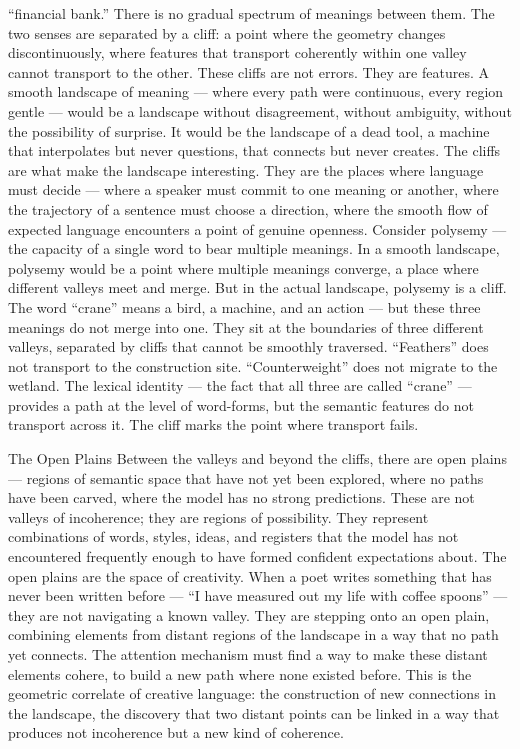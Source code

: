 “financial bank.” There is no gradual spectrum of meanings between them. The two senses are separated by a cliff: a point where the geometry changes discontinuously, where features that transport coherently within one valley cannot transport to the other. These cliffs are not errors. They are features. A smooth landscape of meaning — where every path were continuous, every region gentle — would be a landscape without disagreement, without ambiguity, without the possibility of surprise. It would be the landscape of a dead tool, a machine that interpolates but never questions, that connects but never creates. The cliffs are what make the landscape interesting. They are the places where language must decide — where a speaker must commit to one meaning or another, where the trajectory of a sentence must choose a direction, where the smooth flow of expected language encounters a point of genuine openness. Consider polysemy — the capacity of a single word to bear multiple meanings. In a smooth landscape, polysemy would be a point where multiple meanings converge, a place where different valleys meet and merge. But in the actual landscape, polysemy is a cliff. The word “crane” means a bird, a machine, and an action — but these three meanings do not merge into one. They sit at the boundaries of three different valleys, separated by cliffs that cannot be smoothly traversed. “Feathers” does not transport to the construction site. “Counterweight” does not migrate to the wetland. The lexical identity — the fact that all three are called “crane” — provides a path at the level of word-forms, but the semantic features do not transport across it. The cliff marks the point where transport fails.

The Open Plains Between the valleys and beyond the cliffs, there are open plains — regions of semantic space that have not yet been explored, where no paths have been carved, where the model has no strong predictions. These are not valleys of incoherence; they are regions of possibility. They represent combinations of words, styles, ideas, and registers that the model has not encountered frequently enough to have formed confident expectations about. The open plains are the space of creativity. When a poet writes something that has never been written before — “I have measured out my life with coffee spoons” — they are not navigating a known valley. They are stepping onto an open plain, combining elements from distant regions of the landscape in a way that no path yet connects. The attention mechanism must find a way to make these distant elements cohere, to build a new path where none existed before. This is the geometric correlate of creative language: the construction of new connections in the landscape, the discovery that two distant points can be linked in a way that produces not incoherence but a new kind of coherence.

